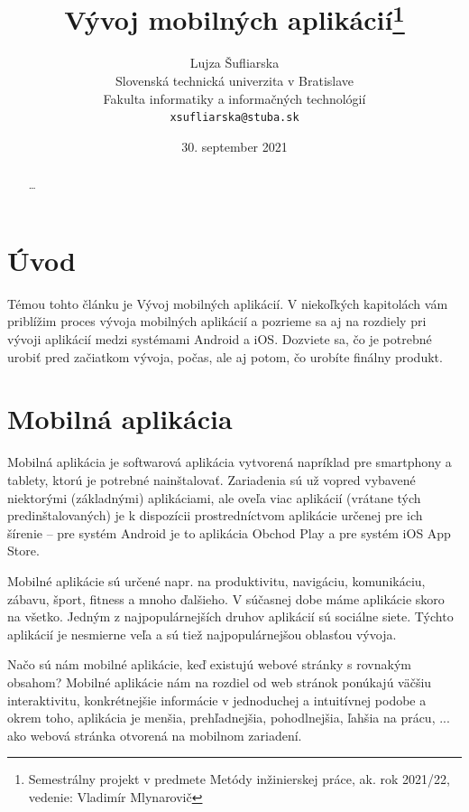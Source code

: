 \documentclass[10pt,twoside,slovak,a4paper]{article}
\title{Vývoj mobilných aplikácií\thanks{Semestrálny projekt v predmete Metódy inžinierskej práce, ak. rok 2021/22, vedenie: Vladimír Mlynarovič}} %
\author{Lujza Šufliarska\\[2pt]
	{\small Slovenská technická univerzita v Bratislave}\\
	{\small Fakulta informatiky a informačných technológií}\\
	{\small \texttt{xsufliarska@stuba.sk}}
	}
\date{\small 30. september 2021} %
\begin{document}
\maketitle
\thispagestyle{empty} %

\begin{abstract}

\ldots
\end{abstract}










\section{Úvod}
\quad Témou tohto článku je Vývoj mobilných aplikácií. V niekoľkých kapitolách vám priblížim proces vývoja mobilných aplikácií a pozrieme sa aj na rozdiely pri vývoji aplikácií medzi systémami Android a iOS. Dozviete sa, čo je potrebné urobiť pred začiatkom vývoja, počas, ale aj potom, čo urobíte finálny produkt.



\section{Mobilná aplikácia}
\quad Mobilná aplikácia je softwarová aplikácia vytvorená napríklad pre smartphony a tablety, ktorú je potrebné nainštalovať. Zariadenia sú už vopred vybavené niektorými (základnými) aplikáciami, ale oveľa viac aplikácií (vrátane tých predinštalovaných) je k dispozícii prostredníctvom aplikácie určenej pre ich šírenie – pre systém Android je to aplikácia Obchod Play a pre systém iOS App Store.

Mobilné aplikácie sú určené napr. na produktivitu, navigáciu, komunikáciu, zábavu, šport, fitness a mnoho ďalšieho. V súčasnej dobe máme aplikácie skoro na všetko. Jedným z najpopulárnejších druhov aplikácií sú sociálne siete. Týchto aplikácií je nesmierne veľa a sú tiež najpopulárnejšou oblasťou vývoja.

Načo sú nám mobilné aplikácie, keď existujú webové stránky s rovnakým obsahom? Mobilné aplikácie nám na rozdiel od web stránok ponúkajú väčšiu interaktivitu, konkrétnejšie informácie v jednoduchej a intuitívnej podobe a okrem toho, aplikácia je menšia, prehľadnejšia, pohodlnejšia, ľahšia na prácu, ... ako webová stránka otvorená na mobilnom zariadení.

\cite{eYewated1, eliteml, amazon}
\end{document}

